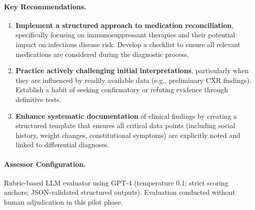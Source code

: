 \paragraph{Key Recommendations.}
\begin{enumerate}
  \item \textbf{Implement a structured approach to medication reconciliation}, specifically focusing on immunosuppressant therapies and their potential impact on infectious disease risk. Develop a checklist to ensure all relevant medications are considered during the diagnostic process.

  \item \textbf{Practice actively challenging initial interpretations}, particularly when they are influenced by readily available data (e.g., preliminary CXR findings). Establish a habit of seeking confirmatory or refuting evidence through definitive tests.

  \item \textbf{Enhance systematic documentation} of clinical findings by creating a structured template that ensures all critical data points (including social history, weight changes, constitutional symptoms) are explicitly noted and linked to differential diagnoses.
\end{enumerate}

\paragraph{Assessor Configuration.}
Rubric-based LLM evaluator using GPT-4 (temperature 0.1; strict scoring anchors; JSON-validated structured outputs). Evaluation conducted without human adjudication in this pilot phase.
